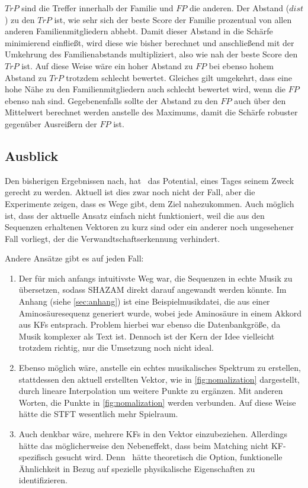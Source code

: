     $TrP$ sind die Treffer innerhalb der Familie und $FP$ die anderen. Der Abstand ($dist$) zu den $TrP$ ist, wie sehr sich der beste Score der Familie prozentual von allen anderen Familienmitgliedern abhebt. Damit dieser Abstand in die Schärfe minimierend einfließt, wird diese wie bisher berechnet und anschließend mit der Umkehrung des Familienabstands multipliziert, also wie nah der beste Score den $TrP$ ist. Auf diese Weise wäre ein hoher Abstand zu $FP$ bei ebenso hohem Abstand zu $TrP$ trotzdem schlecht bewertet. Gleiches gilt umgekehrt, dass eine hohe Nähe zu den Familienmitgliedern auch schlecht bewertet wird, wenn die $FP$ ebenso nah sind. Gegebenenfalls sollte der Abstand zu den $FP$ auch über den Mittelwert berechnet werden anstelle des Maximums, damit die Schärfe robuster gegenüber Ausreißern der $FP$ ist.

    \subsection*{Ausblick} %
        \label{sub:ausblick}
        Den bisherigen Ergebnissen nach, hat \protfin\ das Potential, eines Tages seinem Zweck gerecht zu werden. Aktuell ist dies zwar noch nicht der Fall, aber die Experimente zeigen, dass es Wege gibt, dem Ziel nahezukommen. Auch möglich ist, dass der aktuelle Ansatz einfach nicht funktioniert, weil die aus den Sequenzen erhaltenen Vektoren zu kurz sind oder ein anderer noch ungesehener Fall vorliegt, der die Verwandtschaftserkennung verhindert.

        Andere Ansätze gibt es auf jeden Fall:
        \begin{enumerate}
            \item Der für mich anfangs intuitivste Weg war, die Sequenzen in echte Musik zu übersetzen, sodass SHAZAM direkt darauf angewandt werden könnte. Im Anhang (siehe \autoref{sec:anhang}) ist eine Beispielmusikdatei, die aus einer Aminosäuresequenz generiert wurde, wobei jede Aminosäure in einem Akkord aus \acp{KF} entsprach. Problem hierbei war ebenso die Datenbankgröße, da Musik komplexer als Text ist. Dennoch ist der Kern der Idee vielleicht trotzdem richtig, nur die Umsetzung noch nicht ideal.
            \item Ebenso möglich wäre, anstelle ein echtes musikalisches Spektrum zu erstellen, stattdessen den aktuell erstellten Vektor, wie in \autoref{fig:nomalization} dargestellt, durch lineare Interpolation um weitere Punkte zu ergänzen. Mit anderen Worten, die Punkte in \autoref{fig:nomalization} werden verbunden. Auf diese Weise hätte die \ac{STFT} wesentlich mehr Spielraum.
            \item Auch denkbar wäre, mehrere \acp{KF} in den Vektor einzubeziehen. Allerdings hätte das möglicherweise den Nebeneffekt, dass beim Matching nicht \ac{KF}-spezifisch gesucht wird. Denn \protfin\ hätte theoretisch die Option, funktionelle Ähnlichkeit in Bezug auf spezielle physikalische Eigenschaften zu identifizieren.
        \end{enumerate}
        
